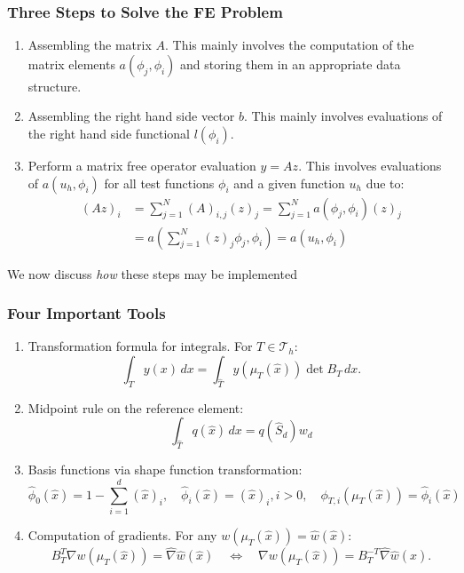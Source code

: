 \documentclass[ignorenonframetext,11pt]{beamer}
\theoremstyle{definition}
\begin{document}
\begin{frame}
\frametitle{Three Steps to Solve the FE Problem}
\begin{enumerate}
\item Assembling the matrix $A$. This mainly involves the computation of the matrix
elements $a(\phi_j,\phi_i)$ and storing them in an appropriate data structure.
\item Assembling the right hand side vector $b$. This mainly involves evaluations of
the right hand side functional $l(\phi_i)$.
\item Perform a matrix free operator evaluation $y=Az$. This involves evaluations
of $a(u_h,\phi_i)$ for all test functions $\phi_i$ and a given function $u_h$ due to:
\begin{align*}
(Az)_i &= \sum_{j=1}^N (A)_{i,j} (z)_j = \sum_{j=1}^N a(\phi_j,\phi_i) (z)_j \\
&= a\left(\sum_{j=1}^N (z)_j\phi_j,\phi_i\right) = a(u_h,\phi_i) 
\end{align*}
\end{enumerate}
We now discuss {\em how} these steps may be implemented
\end{frame}

\begin{frame}
\frametitle{Four Important Tools}
\begin{enumerate}
\item Transformation formula for integrals. For $T\in\mathcal{T}_h$:
\begin{equation*}
\int_T y(x)\,dx = \int_{\hat T} y(\mu_T(\hat x)) \det B_T \,dx .
\end{equation*}
\item Midpoint rule on the reference element:
\begin{equation*}
\int_{\hat T} q(\hat x) \,dx = q(\hat S_d) w_d
\end{equation*}
\item Basis functions via shape function transformation:
\begin{equation*}
\hat\phi_0(\hat x) = 1-\sum_{i=1}^d (\hat x)_i, \quad
\hat\phi_i(\hat x) = (\hat x)_i, i>0, \quad
\phi_{T,i}(\mu_T(\hat x)) = \hat\phi_i(\hat x)
\end{equation*}
\item Computation of gradients. For any $w(\mu_T(\hat x)) = \hat w(\hat x)$:
\begin{equation*}
B_T^T \nabla w(\mu_T(\hat x)) = \hat\nabla \hat w(\hat x) \quad\Leftrightarrow\quad
\nabla w(\mu_T(\hat x)) = B_T^{-T}\hat\nabla \hat w(\hat x) .
\end{equation*}
\end{enumerate}
\end{frame}
\end{document}
